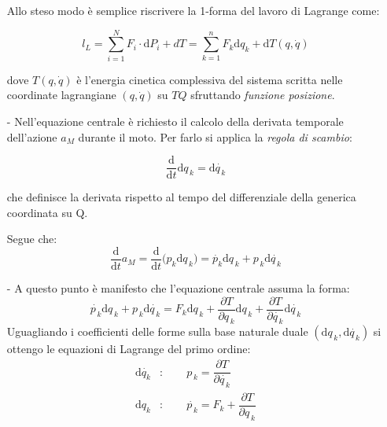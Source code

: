 \documentclass[11pt]{report}
\theoremstyle{plain}
\theoremstyle{definition}
\theoremstyle{remark}
\begin{document}
\begin{itemize}
Allo steso modo è semplice riscrivere la 1-forma del lavoro di Lagrange come:

\begin{displaymath}
l_{L} = \sum_{i=1}^{N} F_{i}\cdot \textrm{d}P_{i} + dT = \sum_{k=1}^{n} F_{k} \textrm{d} q_{k} + \textrm{d}T(q, \dot{q})
\end{displaymath}

dove $ T(q, \dot{q})$ è l'energia cinetica complessiva del sistema scritta nelle coordinate lagrangiane $(q, \dot{q})$ su $TQ$ sfruttando \emph{funzione posizione}.

\item[-] Nell'equazione centrale è richiesto il calcolo della derivata temporale dell'azione $a_{M}$ durante il moto. Per farlo si applica la \emph{regola di scambio}:

\begin{equation}\label{eq:regolascambio}
\dfrac{\textrm{d}}{\textrm{d}t} \textrm{d}q_{\,k} = \textrm{d}\dot{q_{\,k}}
\end{equation}

che definisce la derivata rispetto al tempo del differenziale della generica coordinata su Q.

Segue che:
\begin{displaymath}
\dfrac{\textrm{d}}{\textrm{d}t} a_{M} = \dfrac{\textrm{d}}{\textrm{d}t} \bigr( p_{k}\textrm{d}q_{\,k} \bigr) = \dot{p_{k}} \textrm{d}q_{\,k} +  p_{\,k}\textrm{d}\dot{q_{\,k}}
\end{displaymath}

\item[-] A questo punto è manifesto che l'equazione centrale assuma la forma:
\begin{displaymath}
\dot{p_{\,k}} \textrm{d} q_{\,k} + p_{\,k} \textrm{d} \dot{q_{\,k}} = F_{k} \textrm{d} q_{\,k} + \dfrac{\partial T}{\partial q_{\,k}}\textrm{d}q_{\,k} + \dfrac{\partial T}{\partial \dot{q_{\,k}}}\textrm{d}\dot{q_{\,k}}
\end{displaymath}
Uguagliando i coefficienti delle forme sulla base naturale duale $(\textrm{d} q_{\,k} , \textrm{d} \dot{q_{\,k}})$ si ottengo le equazioni di Lagrange del primo ordine:
\begin{displaymath}\begin{split}
\textrm{d} \dot{q_{k}} &: \qquad p_{\,k} = \dfrac{\partial T}{\partial \dot{q_{\,k}}}\\
\textrm{d} q_{k} &: \qquad \dot{p_{\,k}} = F_{k} + \dfrac{\partial T}{\partial q_{\,k}}\\
\end{split}\end{displaymath}


\end{itemize}
\end{document}
